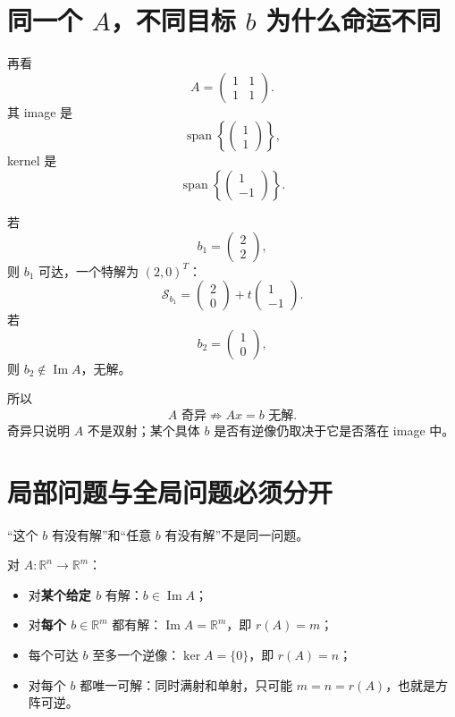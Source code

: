 \documentclass[11pt,a4paper]{ctexart}
\newcommand{\kw}[1]{\textbf{\color{deep}#1}}
\begin{document}
\section{同一个 $A$，不同目标 $b$ 为什么命运不同}

再看
\[
A=\begin{pmatrix}1&1\\1&1\end{pmatrix}.
\]
其 image 是
\[
\operatorname{span}\left\{\begin{pmatrix}1\\1\end{pmatrix}\right\},
\]
kernel 是
\[
\operatorname{span}\left\{\begin{pmatrix}1\\-1\end{pmatrix}\right\}.
\]

若
\[
b_1=\begin{pmatrix}2\\2\end{pmatrix},
\]
则 $b_1$ 可达，一个特解为 $(2,0)^T$：
\[
\mathcal S_{b_1}
=\begin{pmatrix}2\\0\end{pmatrix}
+t\begin{pmatrix}1\\-1\end{pmatrix}.
\]
若
\[
b_2=\begin{pmatrix}1\\0\end{pmatrix},
\]
则 $b_2\notin\operatorname{Im}A$，无解。

所以
\[
\boxed{A\text{ 奇异}\not\Rightarrow Ax=b\text{ 无解}.}
\]
奇异只说明 $A$ 不是双射；某个具体 $b$ 是否有逆像仍取决于它是否落在 image 中。

\section{局部问题与全局问题必须分开}

“这个 $b$ 有没有解”和“任意 $b$ 有没有解”不是同一问题。

对 $A:\mathbb R^n\to\mathbb R^m$：
\begin{itemize}
  \item 对\kw{某个给定 $b$} 有解：$b\in\operatorname{Im}A$；
  \item 对\kw{每个 $b\in\mathbb R^m$} 都有解：$\operatorname{Im}A=\mathbb R^m$，即 $r(A)=m$；
  \item 每个可达 $b$ 至多一个逆像：$\ker A=\{0\}$，即 $r(A)=n$；
  \item 对每个 $b$ 都唯一可解：同时满射和单射，只可能 $m=n=r(A)$，也就是方阵可逆。
\end{itemize}
\end{document}
